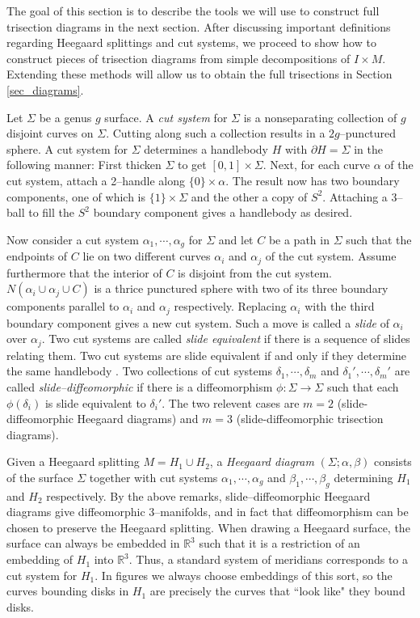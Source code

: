 \documentclass[12pt]{amsart}
\newcommand{\R}{\mathbb{R}}
\newcommand{\del}{\partial }
\theoremstyle{definition}
\theoremstyle{remark}
\begin{document}
The goal of this section is to describe the tools we will use to construct full trisection diagrams in the next section.  After discussing important definitions regarding Heegaard splittings and cut systems, we proceed to show how to construct pieces of trisection diagrams from simple decompositions of $I \times M$.  Extending these methods will allow us to obtain the full trisections in Section \ref{sec_diagrams}.

Let $\Sigma$ be a genus $g$ surface.  A \emph{cut system} for $\Sigma$ is a nonseparating collection of $g$ disjoint curves on $\Sigma$.  Cutting along such a collection results in a $2g$--punctured sphere.  A cut system for $\Sigma$ determines a handlebody $H$ with $\del H = \Sigma$ in the following manner:  First thicken $\Sigma$ to get $[0,1] \times \Sigma$.  Next, for each curve $\alpha$ of the cut system, attach a 2--handle along $\{0\} \times \alpha$.  The result now has two boundary components, one of which is $\{1\} \times \Sigma$ and the other a copy of $S^2$.  Attaching a 3--ball to fill the $S^2$ boundary component gives a handlebody as desired.

Now consider a cut system $\alpha_1,\cdots,\alpha_g$ for $\Sigma$ and let $C$ be a path in $\Sigma$ such that the endpoints of $C$ lie on two different curves $\alpha_i$ and $\alpha_j$ of the cut system.  Assume furthermore that the interior of $C$ is disjoint from the cut system.  $N(\alpha_i \cup \alpha_j \cup C)$ is a thrice punctured sphere with two of its three boundary components parallel to $\alpha_i$ and $\alpha_j$ respectively.  Replacing $\alpha_i$ with the third boundary component gives a new cut system.  Such a move is called a \emph{slide} of $\alpha_i$ over $\alpha_j$.  Two cut systems are called \emph{slide equivalent} if there is a sequence of slides relating them.  Two cut systems are slide equivalent if and only if they determine the same handlebody \cite{Johannson1}.  Two collections of cut systems $\delta_1,\cdots,\delta_m$ and $\delta_1',\cdots,\delta_m'$ are called \emph{slide--diffeomorphic} if there is a diffeomorphism $\phi\colon \Sigma \to \Sigma$ such that each $\phi(\delta_i)$ is slide equivalent to $\delta_i '$.  The two relevent cases are $m=2$ (slide-diffeomorphic Heegaard diagrams) and $m=3$ (slide-diffeomorphic trisection diagrams).

Given a Heegaard splitting $M = H_1 \cup H_2$, a \emph{Heegaard diagram} $(\Sigma; \alpha, \beta)$ consists of the surface $\Sigma$ together with cut systems $\alpha_1,\cdots,\alpha_g$ and $\beta_1,\cdots,\beta_g$ determining $H_1$ and $H_2$ respectively.  By the above remarks, slide--diffeomorphic Heegaard diagrams give diffeomorphic 3--manifolds, and in fact that diffeomorphism can be chosen to preserve the Heegaard splitting.  When drawing a Heegaard surface, the surface can always be embedded in $\R^3$ such that it is a restriction of an embedding of $H_1$ into $\R^3$.  Thus, a standard system of meridians corresponds to a cut system for $H_1$.  In figures we always choose embeddings of this sort, so the curves bounding disks in $H_1$ are precisely the curves that ``look like" they bound disks.
\end{document}
